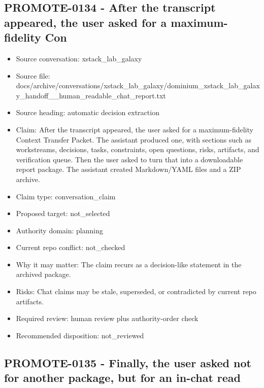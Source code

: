 \documentclass[11pt,a4paper]{report}
\begin{document}
\subsection{PROMOTE-0134 - After the transcript appeared, the user asked for a maximum-fidelity Con}

\begin{itemize}
\item Source conversation: xstack\_lab\_galaxy
\item Source file: docs/archive/conversations/xstack\_lab\_galaxy/dominium\_xstack\_lab\_galaxy\_handoff\_\_human\_readable\_chat\_report.txt
\item Source heading: automatic decision extraction
\item Claim: After the transcript appeared, the user asked for a maximum-fidelity Context Transfer Packet. The assistant produced one, with sections such as workstreams, decisions, tasks, constraints, open questions, risks, artifacts, and verification queue. Then the user asked to turn that into a downloadable report package. The assistant created Markdown/YAML files and a ZIP archive.
\item Claim type: conversation\_claim
\item Proposed target: not\_selected
\item Authority domain: planning
\item Current repo conflict: not\_checked
\item Why it may matter: The claim recurs as a decision-like statement in the archived package.
\item Risks: Chat claims may be stale, superseded, or contradicted by current repo artifacts.
\item Required review: human review plus authority-order check
\item Recommended disposition: not\_reviewed
\end{itemize}

\subsection{PROMOTE-0135 - Finally, the user asked not for another package, but for an in-chat read}
\end{document}
